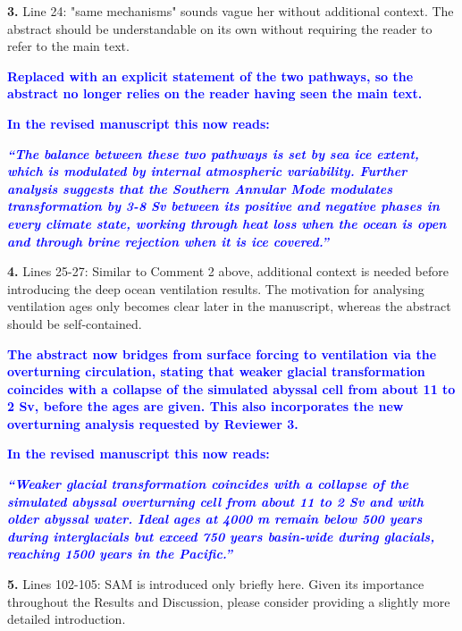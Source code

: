 \documentclass[pdflatex,sn-nature]{sn-jnl}
\begin{document}
\medskip
\noindent \textbf{3.} Line 24: "same mechanisms" sounds vague her without additional context. The abstract should be understandable on its own without requiring the reader to refer to the main text.
\medskip

\noindent\textcolor{blue}{\textbf{Replaced with an explicit statement of the two pathways, so the abstract no longer relies on the reader having seen the main text.}}


\noindent\textcolor{blue}{\textbf{In the revised manuscript this now reads:}}


\medskip
\noindent\textcolor{blue}{\textbf{\textit{``The balance between these two pathways is set by sea ice extent, which is modulated by internal atmospheric variability. Further analysis suggests that the Southern Annular Mode modulates transformation by 3-8 Sv between its positive and negative phases in every climate state, working through heat loss when the ocean is open and through brine rejection when it is ice covered.''}}}
\medskip

\medskip
\noindent \textbf{4.} Lines 25-27: Similar to Comment 2 above, additional context is needed before introducing the deep ocean ventilation results. The motivation for analysing ventilation ages only becomes clear later in the manuscript, whereas the abstract should be self-contained.
\medskip

\noindent\textcolor{blue}{\textbf{The abstract now bridges from surface forcing to ventilation via the overturning circulation, stating that weaker glacial transformation coincides with a collapse of the simulated abyssal cell from about 11 to 2 Sv, before the ages are given. This also incorporates the new overturning analysis requested by Reviewer 3.}}


\noindent\textcolor{blue}{\textbf{In the revised manuscript this now reads:}}


\medskip
\noindent\textcolor{blue}{\textbf{\textit{``Weaker glacial transformation coincides with a collapse of the simulated abyssal overturning cell from about 11 to 2 Sv and with older abyssal water. Ideal ages at 4000 m remain below 500 years during interglacials but exceed 750 years basin-wide during glacials, reaching 1500 years in the Pacific.''}}}
\medskip

\medskip
\noindent \textbf{5.} Lines 102-105: SAM is introduced only briefly here. Given its importance throughout the Results and Discussion, please consider providing a slightly more detailed introduction.
\medskip
\end{document}
